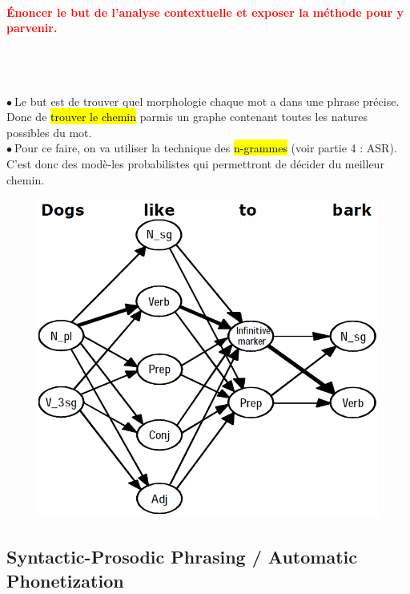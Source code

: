 \documentclass[letterpaper, 12pt]{article}
\newcommand{\red}[1]{
	\textcolor{red}{#1}
}
\newcommand{\point}{$\bullet\ $}
\begin{document}
		\paragraph{\red{Énoncer le but de l'analyse contextuelle et exposer la méthode pour y parvenir.}}~\\~\\
			\begin{minipage}{0.4\textwidth}
				\point Le but est de trouver quel morphologie chaque mot a dans une phrase précise. Donc de
					\hl{trouver le chemin} parmis un graphe contenant toutes les natures possibles du mot.\\
				\point Pour ce faire, on va utiliser la technique des \hl{n-grammes} (voir partie 4 : ASR). 
					C'est donc des modè-les probabilistes qui permettront de décider du meilleur chemin.
			\end{minipage}\hfill
			\begin{minipage}{0.55\textwidth}
				\begin{figure}[H]
					\centering
					\includegraphics[scale=0.5]{Images/contextual}
				\end{figure}\noindent
			\end{minipage}
	\subsection{Syntactic-Prosodic Phrasing / Automatic Phonetization}
\end{document}
